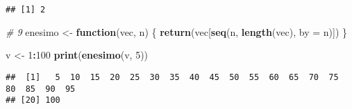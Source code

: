 \documentclass[
]{article}
\newenvironment{Shaded}{\begin{snugshade}}{\end{snugshade}}
\newcommand{\AttributeTok}[1]{\textcolor[rgb]{0.13,0.29,0.53}{#1}}
\newcommand{\CommentTok}[1]{\textcolor[rgb]{0.56,0.35,0.01}{\textit{#1}}}
\newcommand{\ControlFlowTok}[1]{\textcolor[rgb]{0.13,0.29,0.53}{\textbf{#1}}}
\newcommand{\DecValTok}[1]{\textcolor[rgb]{0.00,0.00,0.81}{#1}}
\newcommand{\FunctionTok}[1]{\textcolor[rgb]{0.13,0.29,0.53}{\textbf{#1}}}
\newcommand{\NormalTok}[1]{#1}
\newcommand{\OtherTok}[1]{\textcolor[rgb]{0.56,0.35,0.01}{#1}}
\newcommand{\SpecialCharTok}[1]{\textcolor[rgb]{0.81,0.36,0.00}{\textbf{#1}}}
\begin{document}
\begin{verbatim}
## [1] 2
\end{verbatim}

\begin{Shaded}
\begin{Highlighting}[]
\CommentTok{\# 9}
\NormalTok{enesimo }\OtherTok{\textless{}{-}} \ControlFlowTok{function}\NormalTok{(vec, n) \{}
  \FunctionTok{return}\NormalTok{(vec[}\FunctionTok{seq}\NormalTok{(n, }\FunctionTok{length}\NormalTok{(vec), }\AttributeTok{by =}\NormalTok{ n)])}
\NormalTok{\}}

\NormalTok{v }\OtherTok{\textless{}{-}} \DecValTok{1}\SpecialCharTok{:}\DecValTok{100}
\FunctionTok{print}\NormalTok{(}\FunctionTok{enesimo}\NormalTok{(v, }\DecValTok{5}\NormalTok{))}
\end{Highlighting}
\end{Shaded}

\begin{verbatim}
##  [1]   5  10  15  20  25  30  35  40  45  50  55  60  65  70  75  80  85  90  95
## [20] 100
\end{verbatim}
\end{document}
